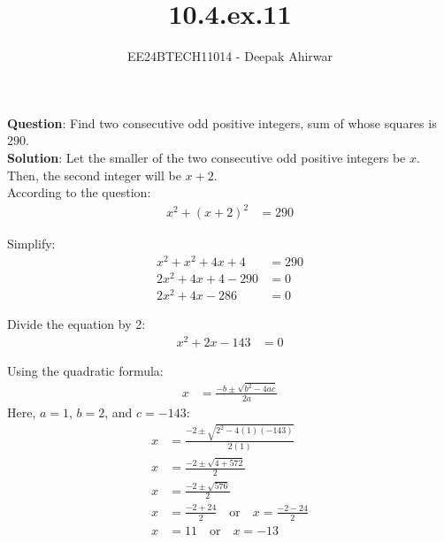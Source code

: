 \documentclass[journal]{IEEEtran}
\begin{document}

\vspace{3cm}

\title{10.4.ex.11}
\author{EE24BTECH11014 - Deepak Ahirwar }
{\let\newpage\relax\maketitle}

\renewcommand{\thefigure}{\theenumi}
\renewcommand{\thetable}{\theenumi}
\setlength{\intextsep}{10pt} %

\renewcommand{\thefigure}{\theenumi}
\renewcommand{\thetable}{\theenumi}
\setlength{\intextsep}{10pt} %

\textbf{Question}: Find two consecutive odd positive integers, sum of whose squares is $290$.\\

\textbf{Solution}:
Let the smaller of the two consecutive odd positive integers be \( x \). Then, the second integer will be \( x + 2 \). 
\\According to the question:
\begin{align}
x^2 + (x + 2)^2 &= 290 \label{eq1}
\end{align}

Simplify:
\begin{align}
x^2 + x^2 + 4x + 4 &= 290 \label{eq2} \\
2x^2 + 4x + 4 - 290 &= 0 \label{eq3} \\
2x^2 + 4x - 286 &= 0 \label{eq4}
\end{align}

Divide the equation by 2:
\begin{align}
x^2 + 2x - 143 &= 0 \label{eq5}
\end{align}

Using the quadratic formula:
\begin{align}
x &= \frac{-b \pm \sqrt{b^2 - 4ac}}{2a} \label{eq6}
\end{align}
Here, \( a = 1 \), \( b = 2 \), and \( c = -143 \):
\begin{align}
x &= \frac{-2 \pm \sqrt{2^2 - 4(1)(-143)}}{2(1)} \label{eq7} \\
x &= \frac{-2 \pm \sqrt{4 + 572}}{2} \label{eq8} \\
x &= \frac{-2 \pm \sqrt{576}}{2} \label{eq9} \\
x &= \frac{-2 + 24}{2} \quad \text{or} \quad x = \frac{-2 - 24}{2} \label{eq10} \\
x &= 11 \quad \text{or} \quad x = -13 \label{eq11}
\end{align}
\end{document}
